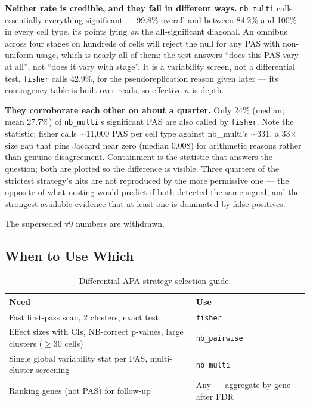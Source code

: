 \documentclass[11pt,a4paper]{article}
\begin{document}
\textbf{Neither rate is credible, and they fail in different ways.}
\texttt{nb\_multi} calls essentially everything significant --- 99.8\% overall and
between 84.2\% and 100\% in every cell type, its points lying \emph{on} the
all-significant diagonal. An omnibus across four stages on hundreds of cells will
reject the null for any PAS with non-uniform usage, which is nearly all of them:
the test answers ``does this PAS vary at all'', not ``does it vary with stage''.
It is a variability screen, not a differential test. \texttt{fisher} calls 42.9\%,
for the pseudoreplication reason given later --- its contingency table is built
over reads, so effective $n$ is depth.

\textbf{They corroborate each other on about a quarter.} Only 24\% (median; mean
27.7\%) of \texttt{nb\_multi}'s significant PAS are also called by
\texttt{fisher}. Note the statistic: fisher calls $\sim$11,000 PAS per cell type
against nb\_multi's $\sim$331, a 33$\times$ size gap that pins Jaccard near zero
(median 0.008) for arithmetic reasons rather than genuine disagreement.
Containment is the statistic that answers the question; both are plotted so the
difference is visible. Three quarters of the strictest strategy's hits are not
reproduced by the more permissive one --- the opposite of what nesting would
predict if both detected the same signal, and the strongest available evidence
that at least one is dominated by false positives.

The superseded v9 numbers are withdrawn.

\subsection{When to Use Which}

\begin{table}[htbp]
  \centering
  \caption{Differential APA strategy selection guide.}
  \label{tab:switch_guide}
  \begin{tabularx}{\textwidth}{lX}
    \toprule
    \textbf{Need} & \textbf{Use} \\
    \midrule
    Fast first-pass scan, 2 clusters, exact test &
      \texttt{fisher} \\
    Effect sizes with CIs, NB-correct p-values, large clusters ($\geq$30 cells) &
      \texttt{nb\_pairwise} \\
    Single global variability stat per PAS, multi-cluster screening &
      \texttt{nb\_multi} \\
    Ranking genes (not PAS) for follow-up &
      Any --- aggregate by gene after FDR \\
    \bottomrule
  \end{tabularx}
\end{table}
\end{document}

